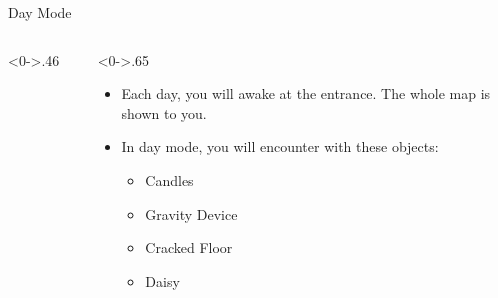 \documentclass[notheorems]{beamer}
\begin{document}
\begin{framenl}{Day Mode}
\begin{columns}[T] %
\begin{column}<0->{.46\textwidth}
\begin{figure}[thpb]
	\centering
	
\end{figure}
\end{column}%
\hfill%
\begin{column}<0->{.65\textwidth}
\begin{itemize}
	\item<1-> Each day, you will awake at the entrance. The whole map is shown to you.
	\item<2-> In day mode, you will encounter with these objects:
		\begin{itemize}
			\item Candles
			\item Gravity Device
			\item Cracked Floor
			\item Daisy
		\end{itemize}
\end{itemize}
\end{column}%
\end{columns}
\end{framenl}
\end{document}

